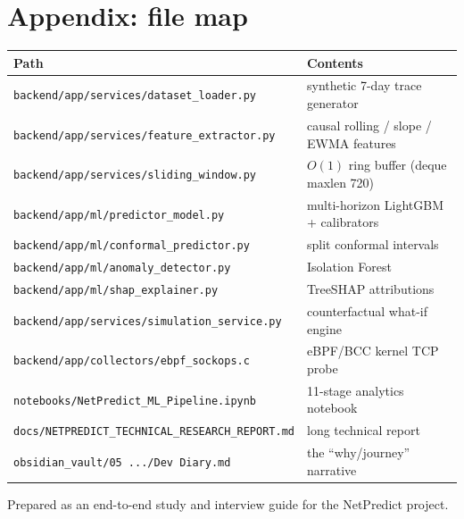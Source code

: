 \documentclass[11pt,a4paper]{article}
\newcommand{\pf}[1]{\nolinkurl{#1}}
\begin{document}
\section*{Appendix: file map}
\begin{center}
\begin{tabularx}{\linewidth}{@{}p{6.2cm}X@{}}
\toprule
\textbf{Path} & \textbf{Contents} \\
\midrule
\pf{backend/app/services/dataset_loader.py} & synthetic 7-day trace generator \\
\pf{backend/app/services/feature_extractor.py} & causal rolling / slope / EWMA features \\
\pf{backend/app/services/sliding_window.py} & $O(1)$ ring buffer (deque maxlen 720) \\
\pf{backend/app/ml/predictor_model.py} & multi-horizon LightGBM + calibrators \\
\pf{backend/app/ml/conformal_predictor.py} & split conformal intervals \\
\pf{backend/app/ml/anomaly_detector.py} & Isolation Forest \\
\pf{backend/app/ml/shap_explainer.py} & TreeSHAP attributions \\
\pf{backend/app/services/simulation_service.py} & counterfactual what-if engine \\
\pf{backend/app/collectors/ebpf_sockops.c} & eBPF/BCC kernel TCP probe \\
\pf{notebooks/NetPredict_ML_Pipeline.ipynb} & 11-stage analytics notebook \\
\pf{docs/NETPREDICT_TECHNICAL_RESEARCH_REPORT.md} & long technical report \\
\texttt{obsidian\_vault/05 .../Dev Diary.md} & the ``why/journey'' narrative \\
\bottomrule
\end{tabularx}
\end{center}

\vfill
\begin{center}\small\textcolor{greydk}{Prepared as an end-to-end study and interview guide for the NetPredict project.}\end{center}
\end{document}
